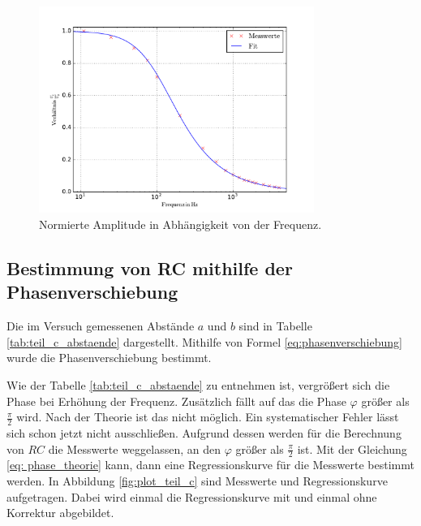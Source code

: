 \begin{figure}
  \centering
  \includegraphics[width=0.8\textwidth]{pics/u_cdurchu_g.pdf}
  \caption{Normierte Amplitude in Abhängigkeit von der Frequenz.}
  \label{fig:teilb}
\end{figure}

\subsection{Bestimmung von RC mithilfe der Phasenverschiebung}
Die im Versuch gemessenen Abstände $a$ und $b$ sind in Tabelle \ref{tab:teil_c_abstaende}
dargestellt. Mithilfe von Formel \eqref{eq:phasenverschiebung} wurde die
Phasenverschiebung bestimmt.



Wie der Tabelle \ref{tab:teil_c_abstaende} zu entnehmen ist, vergrößert sich die Phase
bei Erhöhung der Frequenz.
Zusätzlich fällt auf das die Phase $\varphi$ größer als $\frac{\pi}{2}$ wird.
Nach der Theorie ist das nicht möglich.
Ein systematischer Fehler lässt sich schon jetzt nicht ausschließen.
Aufgrund dessen werden für die Berechnung von $RC$ die Messwerte weggelassen, an den
$\varphi$ größer als $\frac{\pi}{2}$ ist.
Mit der Gleichung \eqref{eq: phase_theorie} kann, dann eine Regressionskurve für die
Messwerte bestimmt werden.
In Abbildung \ref{fig:plot_teil_c} sind Messwerte und Regressionskurve aufgetragen.
Dabei wird einmal die Regressionskurve mit und einmal ohne Korrektur abgebildet.

